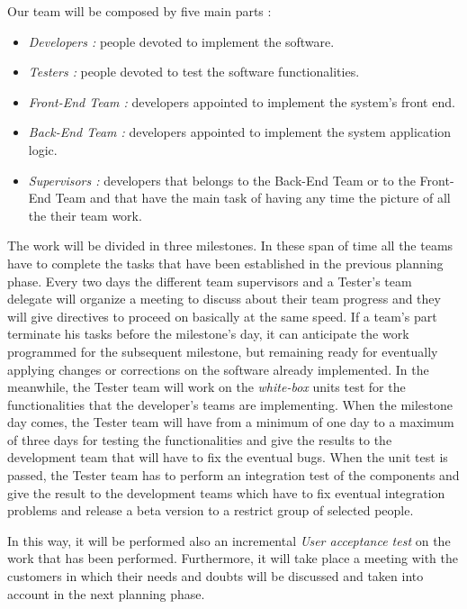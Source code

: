 \newpage
{}
Our team will be composed by five main parts :
\begin{itemize}
	\item \emph{Developers :} people devoted to implement the software.
	
	\item \emph{Testers :} people devoted to test the software functionalities.
	
	\item \emph{Front-End Team :} developers appointed to implement the system’s front end.
	
	
	\item \emph{Back-End Team :} developers appointed to implement the system application logic.
	
	\item \emph{Supervisors :} developers that belongs to the Back-End Team or to the Front-End Team and that have the main task of having any time the picture of all the their team work.
\end{itemize}

The work will be divided in three milestones. In these span of time all the teams have to complete the tasks that have been established in the previous planning phase. Every two days the different team supervisors and a Tester’s team delegate will organize a meeting to discuss about their team progress and they will give directives to proceed on basically at the same speed. If a team’s part terminate his tasks before the milestone’s day, it can anticipate the work programmed for the subsequent milestone, but remaining ready for eventually applying changes or corrections on the software already implemented.
In the meanwhile, the Tester team will work on the \emph{white-box} units test for the functionalities that the developer’s teams are implementing.
When the milestone day comes, the Tester team will have from a minimum of one day to a maximum of three days for testing the functionalities and give the results to the development team that will have to fix the eventual bugs.
When the unit test is passed, the Tester team has to perform an integration test of the components and give the result to the development teams which have to fix eventual integration problems and release a beta version to a restrict group of selected people.

In this way, it will be performed also an incremental \emph{User acceptance test} on the work that has been performed. Furthermore, it will take place a meeting with the customers in which their needs and doubts will be discussed and taken into account in the next planning phase.

